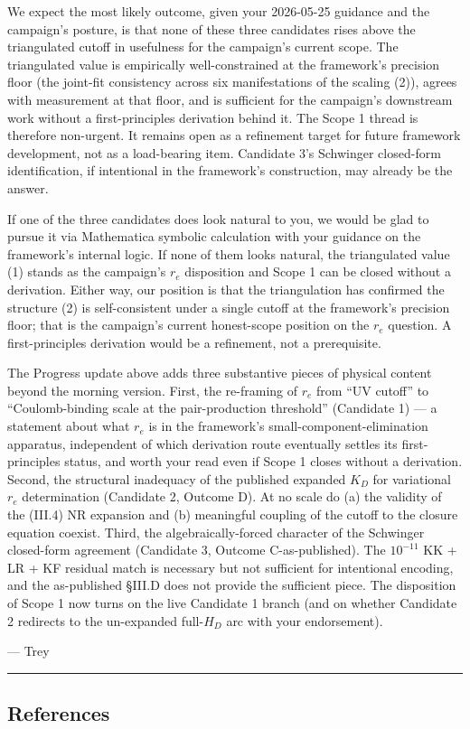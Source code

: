\documentclass[
  11pt,
]{article}
\begin{document}
We expect the most likely outcome, given your 2026-05-25 guidance and
the campaign's posture, is that none of these three candidates rises
above the triangulated cutoff in usefulness for the campaign's current
scope. The triangulated value is empirically well-constrained at the
framework's precision floor (the joint-fit consistency across six
manifestations of the scaling (2)), agrees with measurement at that
floor, and is sufficient for the campaign's downstream work without a
first-principles derivation behind it. The Scope 1 thread is therefore
non-urgent. It remains open as a refinement target for future framework
development, not as a load-bearing item. Candidate 3's Schwinger
closed-form identification, if intentional in the framework's
construction, may already be the answer.

If one of the three candidates does look natural to you, we would be
glad to pursue it via Mathematica symbolic calculation with your
guidance on the framework's internal logic. If none of them looks
natural, the triangulated value (1) stands as the campaign's \(r_e\)
disposition and Scope 1 can be closed without a derivation. Either way,
our position is that the triangulation has confirmed the structure (2)
is self-consistent under a single cutoff at the framework's precision
floor; that is the campaign's current honest-scope position on the
\(r_e\) question. A first-principles derivation would be a refinement,
not a prerequisite.

The Progress update above adds three substantive pieces of physical
content beyond the morning version. First, the re-framing of \(r_e\)
from ``UV cutoff'' to ``Coulomb-binding scale at the pair-production
threshold'' (Candidate 1) --- a statement about what \(r_e\) is in the
framework's small-component-elimination apparatus, independent of which
derivation route eventually settles its first-principles status, and
worth your read even if Scope 1 closes without a derivation. Second, the
structural inadequacy of the published expanded \(K_D\) for variational
\(r_e\) determination (Candidate 2, Outcome D). At no scale do (a) the
validity of the (III.4) NR expansion and (b) meaningful coupling of the
cutoff to the closure equation coexist. Third, the algebraically-forced
character of the Schwinger closed-form agreement (Candidate 3, Outcome
C-as-published). The \(10^{-11}\) KK + LR + KF residual match is
necessary but not sufficient for intentional encoding, and the
as-published §III.D does not provide the sufficient piece. The
disposition of Scope 1 now turns on the live Candidate 1 branch (and on
whether Candidate 2 redirects to the un-expanded full-\(H_D\) arc with
your endorsement).

--- Trey

\begin{center}\rule{0.5\linewidth}{0.5pt}\end{center}

\hypertarget{references}{%
\subsection{References}\label{references}}
\end{document}
